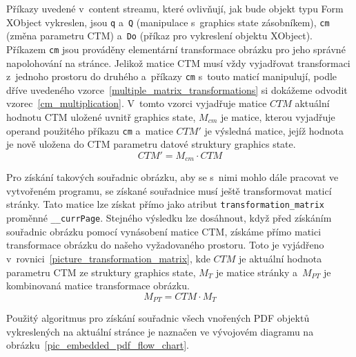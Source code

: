 Příkazy uvedené
v~content streamu, které ovlivňují, jak bude objekt typu Form XObject vykreslen,
jsou \texttt{q} a~\texttt{Q} (manipulace s~graphics state zásobníkem),
\texttt{cm} (změna parametru CTM) a~\texttt{Do} (příkaz pro vykreslení
objektu XObject). Příkazem \texttt{cm} jsou prováděny elementární transformace
obrázku pro jeho správné napolohování na stránce. Jelikož matice CTM musí vždy
vyjadřovat transformaci z~jednoho prostoru do druhého a~příkazy \texttt{cm}
s~touto maticí manipulují, podle dříve uvedeného
vzorce~\eqref{multiple_matrix_transformations} si dokážeme odvodit
vzorec~\eqref{cm_multiplication}. V~tomto vzorci vyjadřuje matice $CTM$
aktuální hodnotu CTM uložené uvnitř graphics state, $M_{cm}$ 
je matice, kterou vyjadřuje operand použitého příkazu \texttt{cm}
a~matice $CTM'$ je výsledná matice, jejíž hodnota je nově uložena do
CTM parametru datové struktury graphics state.
\begin{equation} \label{cm_multiplication}
    CTM' = M_{cm} \cdot CTM
\end{equation}

Pro získání takových souřadnic obrázku, aby se s~nimi mohlo dále pracovat
ve vytvořeném programu, se získané souřadnice musí ještě transformovat
maticí stránky. Tato matice lze získat přímo jako atribut
\texttt{transformation\_matrix} proměnné \texttt{\_\_currPage}.
Stejného výsledku lze dosáhnout, když před získáním souřadnic obrázku pomocí
vynásobení matice CTM, získáme přímo matici transformace obrázku do našeho
vyžadovaného prostoru. Toto je vyjádřeno
v~rovnici~\eqref{picture_transformation_matrix}, kde $CTM$ je aktuální hodnota
parametru CTM ze struktury graphics state, $M_T$ je matice stránky a~$M_{PT}$
je kombinovaná matice transformace obrázku.
\begin{equation} \label{picture_transformation_matrix}
    M_{PT} = CTM \cdot M_{T}
\end{equation}

Použitý algoritmus pro získání souřadnic všech vnořených PDF objektů
vykreslených na aktuální stránce je naznačen ve vývojovém diagramu na
obrázku~\ref{pic_embedded_pdf_flow_chart}.

